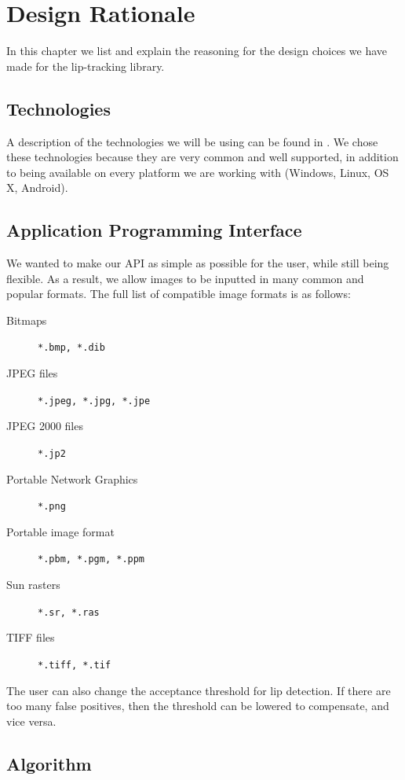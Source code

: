 \chapter{Design Rationale}

In this chapter we list and explain the reasoning for the design choices we have made for the lip-tracking library.

\section{Technologies}

A description of the technologies we will be using can be found in . We chose these technologies because they are very common and well supported, in addition to being available on every platform we are working with (Windows, Linux, OS X, Android). 

\section{Application Programming Interface}

We wanted to make our API as simple as possible for the user, while still being flexible. As a result, we allow images to be inputted in many common and popular formats. The full list of compatible image formats is as follows:

\begin{description}
  \item[Bitmaps] \texttt{*.bmp, *.dib}
  \item[JPEG files] \texttt{*.jpeg, *.jpg, *.jpe}
  \item[JPEG 2000 files] \texttt{*.jp2}
  \item[Portable Network Graphics] \texttt{*.png}
  \item[Portable image format] \texttt{*.pbm, *.pgm, *.ppm}
  \item[Sun rasters] \texttt{*.sr, *.ras}
  \item[TIFF files] \texttt{*.tiff, *.tif}
\end{description}

The user can also change the acceptance threshold for lip detection. If there are too many false positives, then the threshold can be lowered to compensate, and vice versa.

\section{Algorithm}

